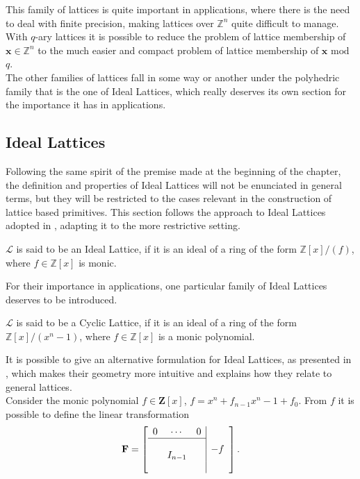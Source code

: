 This family of lattices is quite important in applications, where there is the need to deal with finite precision, making lattices over $\mathbb{Z}^n$ quite difficult to manage. With $q$-ary lattices it is possible to reduce the problem of lattice membership of $\mathbf{x}\in\mathbb{Z}^n$ to the much easier and compact problem of lattice membership of $\mathbf{x}$ $\mathrm{mod}$ $q$.\\
The other families of lattices fall in some way or another under the polyhedric family that is the one of Ideal Lattices, which really deserves its own section for the importance it has in applications.

\subsection{Ideal Lattices}\label{sec:bg:ideal}

Following the same spirit of the premise made at the beginning of the chapter, the definition and properties of Ideal Lattices will not be enunciated in general terms, but they will be restricted to the cases relevant in the construction of lattice based primitives. This section follows the approach to Ideal Lattices adopted in \cite{ideal_lattices}, adapting it to the more restrictive setting.

\begin{definition}
$\mathscr{L}$ is said to be an Ideal Lattice, if it is an ideal of a ring of the form $\mathbb{Z}[x]/(f)$, where $f\in\mathbb{Z}[x]$ is monic.\\
\end{definition}

For their importance in applications, one particular family of Ideal Lattices deserves to be introduced.

\begin{definition}
$\mathscr{L}$ is said to be a Cyclic Lattice, if it is an ideal of a ring of the form $\mathbb{Z}[x]/(x^n-1)$, where $f\in\mathbb{Z}[x]$ is a monic polynomial.\\
\end{definition}

It is possible to give an alternative formulation for Ideal Lattices, as presented in \cite{PQC}, which makes their geometry more intuitive and explains how they relate to general lattices.\\
Consider the monic polynomial $f\in\mathbf{Z}[x]$, $f=x^n+f_{n-1}x^n-1 + f_0$. From $f$ it is possible to define the linear transformation
\begin{equation*}
\mathbf{F}=
\left[\begin{array}{ccc|c}
0&\cdots&0&\multirow{4}{*}{$-f$}\\
\cline{1-3}
&&&\\
&I_{n-1}&&\\
&&&
\end{array}\right].
\end{equation*}

